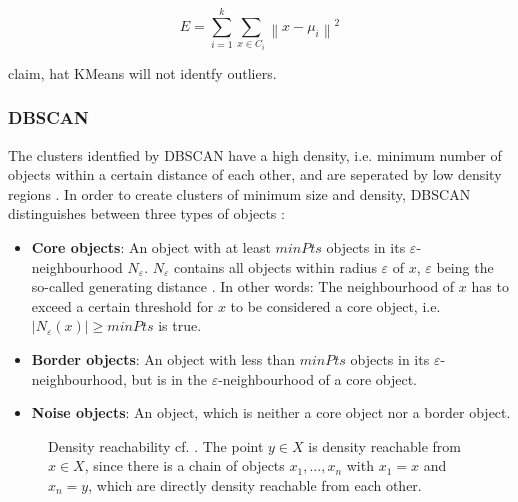 \begin{equation}
    E = \sum_{i=1}^{k} \sum_{x \in C_{i}}\left\|x-\mu_{i}\right\|^{2}
\label{eq:kmeans-error}
\end{equation}

\citeauthor{OPTICS_kMeans_2016} claim, hat KMeans will not identfy outliers.


\subsubsection{DBSCAN}\label{subsec:dbscan}

The clusters identfied by DBSCAN have a high density, i.e. minimum number of objects within a certain distance of each other, and are seperated by low density regions \cite{OPTICS_kMeans_2016}.
In order to create clusters of minimum size and density, DBSCAN distinguishes between three types of objects \cite{OPTICS_kMeans_2016}:

\begin{itemize}
    \item \textbf{Core objects}: 
    An object with at least $minPts$ objects in its $\varepsilon$-neighbourhood $N_\varepsilon$.
    $N_\varepsilon$ contains all objects within radius $\varepsilon$ of $x$, $\varepsilon$ being the so-called generating distance \cite{OPTICS2013}.
    In other words: The neighbourhood of $x$ has to exceed a certain threshold for $x$ to be considered a core object, i.e. $| N_\varepsilon (x) | \geq minPts$ is true.

    \item \textbf{Border objects}: 
    An object with less than $minPts$ objects in its $\varepsilon$-neighbourhood, but is in the $\varepsilon$-neighbourhood of a core object.

    \item \textbf{Noise objects}: 
    An object, which is neither a core object nor a border object.
\end{itemize}

\begin{figure}[htp] %
    \centering
    
    \caption{Density reachability cf. \cite{OPTICS1999}.
    The point $y \in X$ is density reachable from $x \in X$, since there is a chain of objects $x_1, ..., x_n$ with $x_1 = x$ and $x_n = y$, 
    which are directly density reachable from each other.
    }
    \label{fig:density_reachable}
\end{figure}

